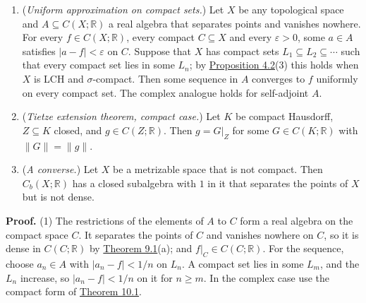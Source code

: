 \documentclass[
  english,
  11pt,
  a4paper,
]{article}
\providecommand{\tightlist}{%
  \setlength{\itemsep}{0pt}\setlength{\parskip}{0pt}}
\begin{document}
\begin{enumerate}
\tightlist
\item
  (\emph{Uniform approximation on compact sets.}) Let \(X\) be any
  topological space and \(A\subseteq C(X;\mathbb R)\) a real algebra
  that separates points and vanishes nowhere. For every
  \(f\in C(X;\mathbb R)\), every compact \(C\subseteq X\) and every
  \(\varepsilon>0\), some \(a\in A\) satisfies \(|a-f|<\varepsilon\) on
  \(C\). Suppose that \(X\) has compact sets
  \(L_1\subseteq L_2\subseteq\cdots\) such that every compact set lies
  in some \(L_n\); by
  \hyperlink{the-stone-weierstrass-theorem-for-functions-vanishing-at-infinity--oa-fnd-sw-15}{Proposition
  4.2}(3) this holds when \(X\) is LCH and \(\sigma\)-compact. Then some
  sequence in \(A\) converges to \(f\) uniformly on every compact set.
  The complex analogue holds for self-adjoint \(A\).
\item
  (\emph{Tietze extension theorem, compact case.}) Let \(K\) be compact
  Hausdorff, \(Z\subseteq K\) closed, and \(g\in C(Z;\mathbb R)\). Then
  \(g=G|_Z\) for some \(G\in C(K;\mathbb R)\) with \(\|G\|=\|g\|\).
\item
  (\emph{A converse.}) Let \(X\) be a metrizable space that is not
  compact. Then \(C_b(X;\mathbb R)\) has a closed subalgebra with \(1\)
  in it that separates the points of \(X\) but is not dense.
\end{enumerate}

\textbf{Proof.} (1) The restrictions of the elements of \(A\) to \(C\)
form a real algebra on the compact space \(C\). It separates the points
of \(C\) and vanishes nowhere on \(C\), so it is dense in
\(C(C;\mathbb R)\) by
\hyperlink{the-stone-weierstrass-theorem-for-functions-vanishing-at-infinity--oa-fnd-sw-07}{Theorem
9.1}(a); and \(f|_C\in C(C;\mathbb R)\). For the sequence, choose
\(a_n\in A\) with \(|a_n-f|<1/n\) on \(L_n\). A compact set lies in some
\(L_m\), and the \(L_n\) increase, so \(|a_n-f|<1/n\) on it for
\(n\geq m\). In the complex case use the compact form of
\hyperlink{the-stone-weierstrass-theorem-for-functions-vanishing-at-infinity--oa-fnd-sw-09}{Theorem
10.1}.
\end{document}
